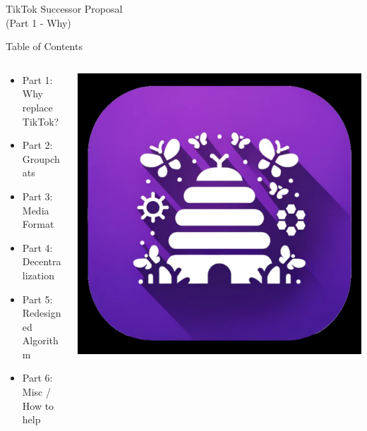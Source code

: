 \documentclass[aspectratio=169]{beamer}
\begin{document}
\begin{frame}
    \centering
    \Huge TikTok Successor Proposal \\
    \Huge (Part 1 - Why)
\end{frame}

\begin{frame}{Table of Contents}
\begin{columns}[T]
    \begin{column}[T]{0.5\textwidth}
        \begin{itemize}
            \item Part 1: Why replace TikTok?
            \item Part 2: Groupchats 
            \item Part 3: Media Format
            \item Part 4: Decentralization
            \item Part 5: Redesigned Algorithm
            \item Part 6: Misc / How to help
        \end{itemize}
    \end{column}
    
    \begin{column}{0.5\textwidth}
        \includegraphics[height=0.8\textheight]{imgs/app_icons/2.png}
    \end{column}
\end{columns}
\end{frame}
\end{document}
